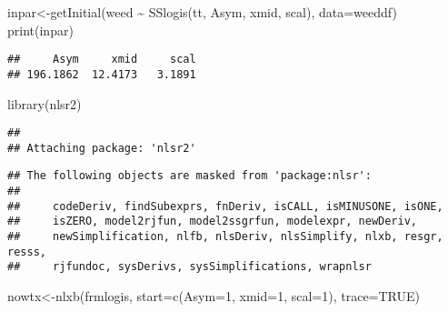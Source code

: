 \documentclass[
]{article}
\newenvironment{Shaded}{\begin{snugshade}}{\end{snugshade}}
\newcommand{\AttributeTok}[1]{\textcolor[rgb]{0.77,0.63,0.00}{#1}}
\newcommand{\ConstantTok}[1]{\textcolor[rgb]{0.00,0.00,0.00}{#1}}
\newcommand{\DecValTok}[1]{\textcolor[rgb]{0.00,0.00,0.81}{#1}}
\newcommand{\FunctionTok}[1]{\textcolor[rgb]{0.00,0.00,0.00}{#1}}
\newcommand{\NormalTok}[1]{#1}
\newcommand{\OtherTok}[1]{\textcolor[rgb]{0.56,0.35,0.01}{#1}}
\newcommand{\SpecialCharTok}[1]{\textcolor[rgb]{0.00,0.00,0.00}{#1}}
\begin{document}
\begin{Shaded}
\begin{Highlighting}[]
\NormalTok{inpar}\OtherTok{\textless{}{-}}\FunctionTok{getInitial}\NormalTok{(weed }\SpecialCharTok{\textasciitilde{}} \FunctionTok{SSlogis}\NormalTok{(tt, Asym, xmid, scal), }\AttributeTok{data=}\NormalTok{weeddf)}
\FunctionTok{print}\NormalTok{(inpar)}
\end{Highlighting}
\end{Shaded}

\begin{verbatim}
##     Asym     xmid     scal 
## 196.1862  12.4173   3.1891
\end{verbatim}

\begin{Shaded}
\begin{Highlighting}[]
\FunctionTok{library}\NormalTok{(nlsr2)}
\end{Highlighting}
\end{Shaded}

\begin{verbatim}
## 
## Attaching package: 'nlsr2'
\end{verbatim}

\begin{verbatim}
## The following objects are masked from 'package:nlsr':
## 
##     codeDeriv, findSubexprs, fnDeriv, isCALL, isMINUSONE, isONE,
##     isZERO, model2rjfun, model2ssgrfun, modelexpr, newDeriv,
##     newSimplification, nlfb, nlsDeriv, nlsSimplify, nlxb, resgr, resss,
##     rjfundoc, sysDerivs, sysSimplifications, wrapnlsr
\end{verbatim}

\begin{Shaded}
\begin{Highlighting}[]
\NormalTok{nowtx}\OtherTok{\textless{}{-}}\FunctionTok{nlxb}\NormalTok{(frmlogis, }\AttributeTok{start=}\FunctionTok{c}\NormalTok{(}\AttributeTok{Asym=}\DecValTok{1}\NormalTok{, }\AttributeTok{xmid=}\DecValTok{1}\NormalTok{, }\AttributeTok{scal=}\DecValTok{1}\NormalTok{), }\AttributeTok{trace=}\ConstantTok{TRUE}\NormalTok{)}
\end{Highlighting}
\end{Shaded}
\end{document}
